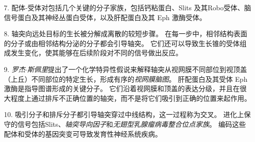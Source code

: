 7. 配体-受体对包括几个关键的分子家族，包括钙粘蛋白、Slits 及其Robo受体、脑信号蛋白及其神经丛蛋白受体，以及肝配蛋白及其 Eph 激酶受体。


8. 轴突向远处目标的生长被分解成离散的较短步骤。 
在每一步中，相邻结构表面的分子或由相邻结构分泌的分子都会引导轴突。
它们还可以导致生长锥的受体组成发生变化，使其能够在后续阶段对不同的信号做出反应。


9. \textit{罗杰$\cdot$斯佩里}提出了一个化学特异性假说来解释轴突从视网膜不同部位到视顶盖（上丘）不同部位的特定生长，形成有序的\textit{视网膜脑图}。
肝配蛋白及其受体 Eph 激酶是指导图谱形成的关键分子。
它们沿着视网膜和顶盖的表达分级，并且在很大程度上通过排斥不正确位置的轴突，而不是将它们吸引到正确的位置来起作用。


10. 吸引分子和排斥分子都引导轴突穿过中线结构，这一过程称为交叉。
进化上保守的信号包括Slits、\textit{轴突导向因子}和\textit{无翅型乳腺瘤病毒整合位点家族}。
编码这些配体和受体的基因突变可导致发育性神经系统疾病。

